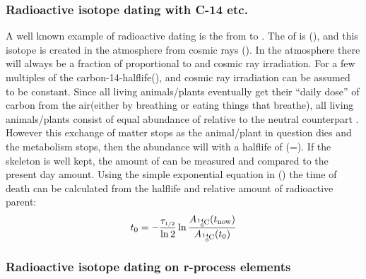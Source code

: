\subsubsection{Radioactive isotope dating with C-14 etc.}
A well known example of radioactive dating is the \betadecay from  to . The \halflife of  is (), and this isotope is created in the atmosphere from cosmic rays (). In the atmosphere there will always be a fraction of   proportional to  and cosmic ray irradiation.
For a few multiples of the carbon-14-halflife(),  and cosmic ray irradiation can be assumed to be constant. Since all living animals/plants eventually get their ``daily dose'' of carbon from the air(either by breathing or eating things that breathe), all living animals/plants consist of equal abundance of  relative to the neutral counterpart . However this exchange of matter stops as the animal/plant in question dies and the metabolism stops, then the  abundance will \betadecay with a halflife of (\halflife=). If the skeleton is well kept, the amount of  can be measured and compared to the present day amount. Using the simple exponential equation in () the time of death can be calculated from the halflife and relative amount of radioactive parent:
$$ t_0 = -\frac{\halflife}{\ln 2} \ln \frac{A_\isotope{C}{6}{14}(t_{\text{now}})}{A_\isotope{C}{6}{14}(t_0)}$$
\subsubsection{Radioactive isotope dating on r-process elements}
